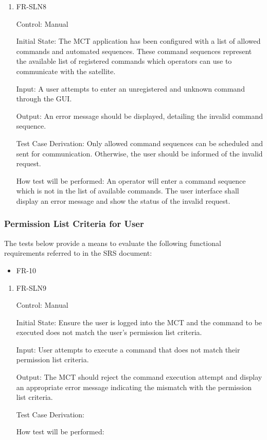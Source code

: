 \documentclass[12pt, titlepage]{article}
\begin{document}
\begin{enumerate}

\item{FR-SLN8\\}

Control: Manual
					
Initial State: The MCT application has been configured with a list of allowed commands and automated sequences. These command sequences represent the available list of registered commands which operators can use to communicate with the satellite.
					
Input: A user attempts to enter an unregistered and unknown command through the GUI.
					
Output: An error message should be displayed, detailing the invalid command sequence.

Test Case Derivation: Only allowed command sequences can be scheduled and sent for communication. Otherwise, the user should be informed of the invalid request.
					
How test will be performed: 
An operator will enter a command sequence which is not in the list of available commands. The user interface shall display an error message and show the status of the invalid request.

\end{enumerate}

\subsubsection{Permission List Criteria for User}

The tests below provide a means to evaluate the following functional requirements referred to in the SRS document:
\begin{itemize}
    \item FR-10
\end{itemize}

\begin{enumerate}

\item{FR-SLN9\\}

Control: Manual
					
Initial State: Ensure the user is logged into the MCT and the command to be executed does not match the user's permission list criteria.
	
Input: User attempts to execute a command that does not match their permission list criteria.
					
Output: The MCT should reject the command execution attempt and display an appropriate error message indicating the mismatch with the permission list criteria.

Test Case Derivation:
					
How test will be performed:

\end{enumerate}
\end{document}
